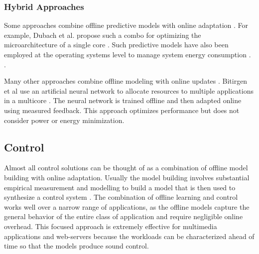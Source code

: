 \subsubsection{Hybrid Approaches}
Some approaches combine offline predictive models with online
adaptation
\cite{Zhang2012,packandcap,Winter2010,dubach2010,Koala,Cinder,
  wu2012inferred}.  For example, Dubach et al.  propose such a combo
for optimizing the microarchitecture of a single core
\cite{dubach2010}.  Such predictive models have also been employed at
the operating systems level to manage system energy consumption \cite{Koala,Cinder}.
\cite{wu2012inferred}.


Many other approaches combine offline modeling with online
updates \cite{JouleGuard,Bitirgen2008,Ipek}.  Bitirgen et
al use an artificial neural network to allocate resources to multiple
applications in a multicore \cite{Bitirgen2008}.  The neural network
is trained offline and then adapted online using measured feedback.
This approach optimizes performance but does not consider power or
energy minimization. 

\subsection{Control}
Almost all control solutions can be thought of as a combination of
offline model building with online adaptation.  Usually the model
building involves substantial empirical measurement and modelling to build a model that is then used to synthesize a control
system
\cite{Wu2004,TCST,Chen2011,PTRADE,POET,ControlWare,Agilos,Rajkumar,Sojka,Raghavendra2008}.
The combination of offline
learning and control works well over a narrow range of applications, as the offline models capture the
general behavior of the entire class of application and require
negligible online overhead.  This focused approach is extremely
effective for multimedia applications
\cite{grace2,flinn99,flinn2004,xtune,TCST} and web-servers
\cite{Horvarth,LuEtAl-2006a,SunDaiPan-2008a} because the workloads can
be characterized ahead of time so that the models produce sound
control.

